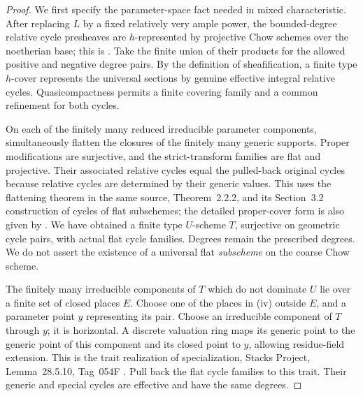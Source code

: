 \documentclass[11pt,a4paper]{article}
\theoremstyle{definition}\newtheorem{definition}[theorem]{Definition}
\theoremstyle{remark}\newtheorem{remark}[theorem]{Remark}
\begin{document}
\begin{proof}
We first specify the parameter-space fact needed in mixed characteristic. After replacing $L$ by a fixed relatively very ample power, the bounded-degree relative cycle presheaves are $h$-represented by projective Chow schemes over the noetherian base; this is \citet[Theorem~4.4.11 and Corollary~4.4.13, manuscript pp.~79--81]{SuslinVoevodsky00}. Take the finite union of their products for the allowed positive and negative degree pairs. By the definition of sheafification, a finite type $h$-cover represents the universal sections by genuine effective integral relative cycles. Quasicompactness permits a finite covering family and a common refinement for both cycles.

On each of the finitely many reduced irreducible parameter components, simultaneously flatten the closures of the finitely many generic supports. Proper modifications are surjective, and the strict-transform families are flat and projective. Their associated relative cycles equal the pulled-back original cycles because relative cycles are determined by their generic values. This uses the flattening theorem in the same source, Theorem~2.2.2, and its Section~3.2 construction of cycles of flat subschemes; the detailed proper-cover form is also given by \citet[Lemmas~6.3.19, 6.3.24 and Theorem~6.3.25, pp.~188--193]{Anderson19}. We have obtained a finite type $U$-scheme $T$, surjective on geometric cycle pairs, with actual flat cycle families. Degrees remain the prescribed degrees. We do not assert the existence of a universal flat \emph{subscheme} on the coarse Chow scheme.

The finitely many irreducible components of $T$ which do not dominate $U$ lie over a finite set of closed places $E$. Choose one of the places in (iv) outside $E$, and a parameter point $y$ representing its pair. Choose an irreducible component of $T$ through $y$; it is horizontal. A discrete valuation ring maps its generic point to the generic point of this component and its closed point to $y$, allowing residue-field extension. This is the trait realization of specialization, Stacks Project, Lemma~28.5.10, Tag~054F \citep{Stacks054F}. Pull back the flat cycle families to this trait. Their generic and special cycles are effective and have the same degrees.


\end{proof}
\end{document}
